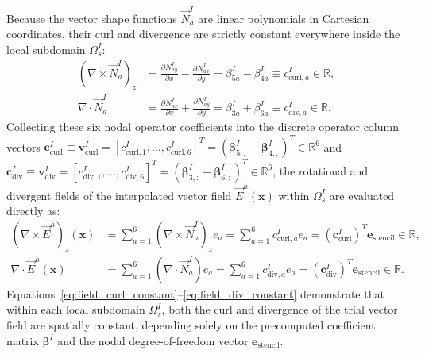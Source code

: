 \documentclass[VANCOUVER,Times1COL]{WileyNJD-v5}
\begin{document}
Because the vector shape functions $\vec{N}_a^I$ are linear polynomials in Cartesian coordinates, their curl and divergence are strictly constant everywhere inside the local subdomain $\Omega_s^I$:
\begin{align}
    (\nabla \times \vec{N}_a^I)_z & = \frac{\partial N_{ay}^I}{\partial x} - \frac{\partial N_{ax}^I}{\partial y} = \beta_{5a}^I - \beta_{4a}^I \equiv c_{\mathrm{curl}, a}^I \in \mathbb{R}, \label{eq:curl_constant} \\
    \nabla \cdot \vec{N}_a^I      & = \frac{\partial N_{ax}^I}{\partial x} + \frac{\partial N_{ay}^I}{\partial y} = \beta_{3a}^I + \beta_{6a}^I \equiv c_{\mathrm{div}, a}^I \in \mathbb{R}. \label{eq:div_constant}
\end{align}
Collecting these six nodal operator coefficients into the discrete operator column vectors $\mathbf{c}_{\mathrm{curl}}^I \equiv \mathbf{v}_{\mathrm{curl}}^I = [c_{\mathrm{curl}, 1}^I, \dots, c_{\mathrm{curl}, 6}^I]^T = (\boldsymbol{\beta}_{5, :}^I - \boldsymbol{\beta}_{4, :}^I)^T \in \mathbb{R}^6$ and $\mathbf{c}_{\mathrm{div}}^I \equiv \mathbf{v}_{\mathrm{div}}^I = [c_{\mathrm{div}, 1}^I, \dots, c_{\mathrm{div}, 6}^I]^T = (\boldsymbol{\beta}_{3, :}^I + \boldsymbol{\beta}_{6, :}^I)^T \in \mathbb{R}^6$, the rotational and divergent fields of the interpolated vector field $\vec{E}^h(\mathbf{x})$ within $\Omega_s^I$ are evaluated directly as:
\begin{align}
    (\nabla \times \vec{E}^h)_z(\mathbf{x}) & = \sum_{a=1}^6 (\nabla \times \vec{N}_a^I)_z e_a = \sum_{a=1}^6 c_{\mathrm{curl}, a}^I e_a = (\mathbf{c}_{\mathrm{curl}}^I)^T \mathbf{e}_{\mathrm{stencil}} \in \mathbb{R}, \label{eq:field_curl_constant} \\
    \nabla \cdot \vec{E}^h(\mathbf{x})      & = \sum_{a=1}^6 (\nabla \cdot \vec{N}_a^I) e_a = \sum_{a=1}^6 c_{\mathrm{div}, a}^I e_a = (\mathbf{c}_{\mathrm{div}}^I)^T \mathbf{e}_{\mathrm{stencil}} \in \mathbb{R}. \label{eq:field_div_constant}
\end{align}
Equations~\eqref{eq:field_curl_constant}--\eqref{eq:field_div_constant} demonstrate that within each local subdomain $\Omega_s^I$, both the curl and divergence of the trial vector field are spatially constant, depending solely on the precomputed coefficient matrix $\boldsymbol{\beta}^I$ and the nodal degree-of-freedom vector $\mathbf{e}_{\mathrm{stencil}}$.
\end{document}
